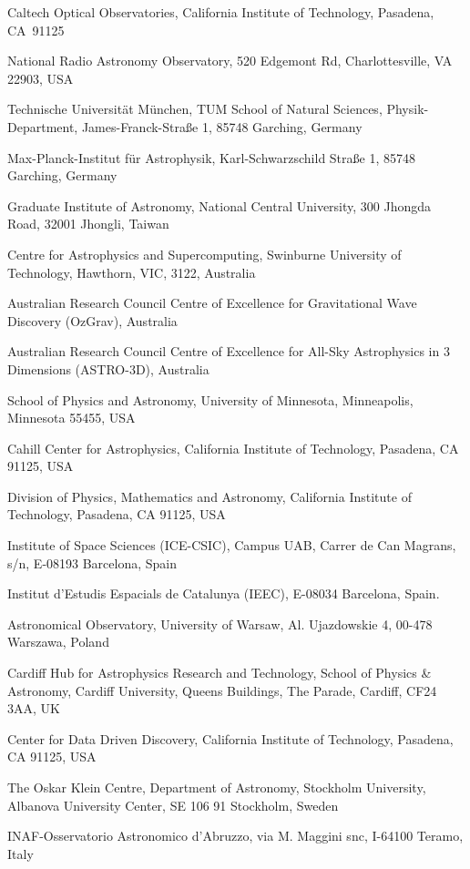 \documentclass{nature_plusfigure}
\begin{document}
\begin{small}
\begin{affiliations}
\item Caltech Optical Observatories, California Institute of Technology, Pasadena, CA 91125
\item National Radio Astronomy Observatory, 520 Edgemont Rd, Charlottesville, VA 22903, USA
\item Technische Universit{\"a}t M{\"u}nchen, TUM School of Natural Sciences, Physik-Department, James-Franck-Stra{\ss}e 1, 85748 Garching, Germany
\item Max-Planck-Institut f{\"u}r Astrophysik, Karl-Schwarzschild Stra{\ss}e 1, 85748 Garching, Germany
\item Graduate Institute of Astronomy, National Central University, 300 Jhongda Road, 32001 Jhongli, Taiwan
\item Centre for Astrophysics and Supercomputing, Swinburne University of Technology, Hawthorn, VIC, 3122, Australia
\item Australian Research Council Centre of Excellence for Gravitational Wave Discovery (OzGrav), Australia
\item Australian Research Council Centre of Excellence for All-Sky Astrophysics in 3 Dimensions (ASTRO-3D), Australia
\item School of Physics and Astronomy, University of Minnesota, Minneapolis, Minnesota 55455, USA
\item Cahill Center for Astrophysics, California Institute of Technology, Pasadena, CA 91125, USA
\item Division of Physics, Mathematics and Astronomy, California Institute of Technology, Pasadena, CA 91125, USA
\item Institute of Space Sciences (ICE-CSIC), Campus UAB, Carrer de Can Magrans, s/n, E-08193 Barcelona, Spain
\item Institut d’Estudis Espacials de Catalunya (IEEC), E-08034 Barcelona, Spain.
\item Astronomical Observatory, University of Warsaw, Al. Ujazdowskie 4, 00-478 Warszawa, Poland
\item Cardiff Hub for Astrophysics Research and Technology, School of Physics \& Astronomy, Cardiff University, Queens Buildings, The Parade, Cardiff, CF24 3AA, UK
\item Center for Data Driven Discovery, California Institute of Technology, Pasadena, CA 91125, USA
\item The Oskar Klein Centre, Department of Astronomy, Stockholm University, Albanova University Center, SE 106 91 Stockholm, Sweden
\item INAF-Osservatorio Astronomico d’Abruzzo, via M. Maggini snc, I-64100 Teramo, Italy

\end{affiliations}
\end{small}
\end{document}
